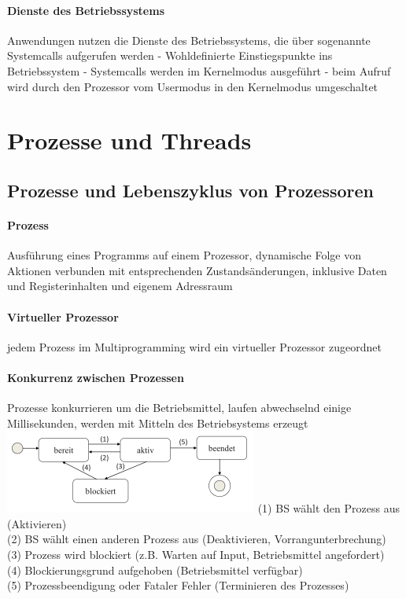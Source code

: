\documentclass[10pt,a4paper,landscape]{article}
\begin{document}
\begin{multicols*}{3}
	\paragraph{Dienste des Betriebssystems} Anwendungen nutzen die Dienste des Betriebssystems, die über sogenannte Systemcalls aufgerufen werden - Wohldefinierte Einstiegspunkte ins Betriebssystem - Systemcalls werden im Kernelmodus ausgeführt - beim Aufruf wird durch den Prozessor vom Usermodus in den Kernelmodus umgeschaltet
	\section{Prozesse und Threads}
	\subsection{Prozesse und Lebenszyklus von Prozessoren}
	\paragraph{Prozess} Ausführung eines Programms auf einem Prozessor, dynamische Folge von Aktionen verbunden mit entsprechenden Zustandsänderungen, inklusive Daten und Registerinhalten und eigenem Adressraum
	\paragraph{Virtueller Prozessor} jedem Prozess im Multiprogramming wird ein virtueller Prozessor zugeordnet
	\paragraph{Konkurrenz zwischen Prozessen} Prozesse konkurrieren um die Betriebsmittel, laufen abwechselnd einige Millisekunden, werden mit Mitteln des Betriebsystems erzeugt
	\includegraphics[width=1\columnwidth]{prozesse}
	(1) BS wählt den Prozess aus (Aktivieren)\\
	(2) BS wählt einen anderen Prozess aus (Deaktivieren, Vorrangunterbrechung)\\
	(3) Prozess wird blockiert (z.B. Warten auf Input, Betriebsmittel angefordert)\\
	(4) Blockierungsgrund aufgehoben (Betriebsmittel verfügbar)\\
	(5) Prozessbeendigung oder Fataler Fehler (Terminieren des Prozesses)\\

\end{multicols*}
\end{document}
